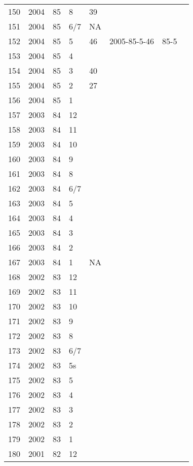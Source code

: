 \begin{longtable}{ |l|l|l|l|l|l|l|l| }
150 & 2004 & 85 &     8 &      39 &  &  & \\
151 & 2004 & 85 &   6/7 &      NA &  &  & \\
152 & 2004 & 85 &     5 &      46 & 2005-85-5-46 & 85-5 & \\
153 & 2004 & 85 &     4 &         &  &  & \\
154 & 2004 & 85 &     3 &      40 &  &  & \\
155 & 2004 & 85 &     2 &      27 &  &  & \\
156 & 2004 & 85 &     1 &         &  &  & \\
157 & 2003 & 84 &    12 &         &  &  & \\
158 & 2003 & 84 &    11 &         &  &  & \\
159 & 2003 & 84 &    10 &         &  &  & \\
160 & 2003 & 84 &     9 &         &  &  & \\
161 & 2003 & 84 &     8 &         &  &  & \\
162 & 2003 & 84 &   6/7 &         &  &  & \\
163 & 2003 & 84 &     5 &         &  &  & \\
164 & 2003 & 84 &     4 &         &  &  & \\
165 & 2003 & 84 &     3 &         &  &  & \\
166 & 2003 & 84 &     2 &         &  &  & \\
167 & 2003 & 84 &     1 &     NA  &  &  & \\
168 & 2002 & 83 &    12 &         &  &  & \\
169 & 2002 & 83 &    11 &         &  &  & \\
170 & 2002 & 83 &    10 &         &  &  & \\
171 & 2002 & 83 &     9 &         &  &  & \\
172 & 2002 & 83 &     8 &         &  &  & \\
173 & 2002 & 83 &   6/7 &         &  &  & \\
174 & 2002 & 83 &    5s &         &  &  & \\
175 & 2002 & 83 &     5 &         &  &  & \\
176 & 2002 & 83 &     4 &         &  &  & \\
177 & 2002 & 83 &     3 &         &  &  & \\
178 & 2002 & 83 &     2 &         &  &  & \\
179 & 2002 & 83 &     1 &         &  &  & \\
180 & 2001 & 82 &    12 &         &  &  & \\

\end{longtable}

